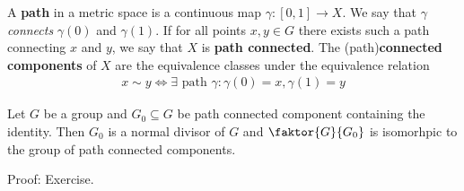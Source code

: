 \begin{dfn}[]
  A \textbf{path} in a metric space is a continuous map $\gamma: [0,1] \to  X$.
  We say that $\gamma$ \emph{connects} $\gamma(0)$ and $\gamma(1)$.
  If for all points $x,y \in G$ there exists such a path connecting $x$ and $y$, we say that $X$ is \textbf{path connected}.
  The (path)\textbf{connected components} of $X$ are the equivalence classes under the equivalence relation
  \begin{align*}
    x \sim y \iff \exists \text{ path } \gamma: \gamma(0) = x, \gamma(1) = y
  \end{align*}
\end{dfn}

\begin{thm}[]
Let $G$ be a group and $G_0 \subseteq G$ be path connected component containing the identity. 
Then $G_0$ is a normal divisor of $G$ and $\faktor{G}{G_0}$ is isomorhpic to the group of path connected components.
\end{thm}
Proof: Exercise.



































